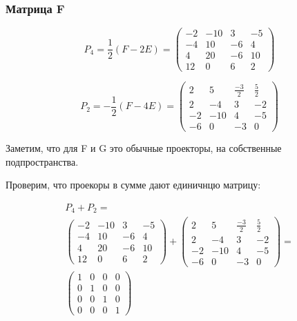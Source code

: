 \documentclass[12pt, a4paper]{article}
\begin{document}
    \subsubsection{Матрица F}

    \begin{equation}
        P_4 = \frac{1}{2} (F - 2E) = \left(\begin{matrix}
            -2 & -10 & 3 & -5 \\
            -4 & 10 & -6 & 4 \\
            4 & 20 & -6 & 10 \\
            12 & 0 & 6 & 2
        \end{matrix}\right)
    \end{equation}


    \begin{equation}
        P_2 = -\frac{1}{2} (F - 4E) = \left(\begin{matrix}
            2 & 5 & \frac{-3}{2} & \frac{5}{2} \\
            2 & -4 & 3 & -2 \\
            -2 & -10 & 4 & -5 \\
            -6 & 0 & -3 & 0
        \end{matrix}\right)
    \end{equation}

    Заметим, что для F  и G это обычные проекторы, на собственные подпространства.

    Проверим, что проекоры в сумме дают единичнцю матрицу:

    \begin{multline}
        P_4 + P_2 =  \\ 
        \left(\begin{matrix}
            -2 & -10 & 3 & -5 \\
            -4 & 10 & -6 & 4 \\
            4 & 20 & -6 & 10 \\
            12 & 0 & 6 & 2
        \end{matrix}\right) + \left(\begin{matrix}
            2 & 5 & \frac{-3}{2} & \frac{5}{2} \\
            2 & -4 & 3 & -2 \\
            -2 & -10 & 4 & -5 \\
            -6 & 0 & -3 & 0
        \end{matrix}\right) = \\
        \left(\begin{matrix}
            1 & 0 & 0 & 0 \\
            0 & 1 & 0 & 0 \\
            0 & 0 & 1 & 0 \\
            0 & 0 & 0 & 1
        \end{matrix}\right)
    \end{multline}    
\end{document}
